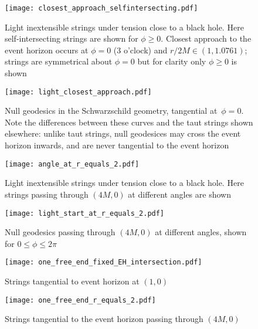 \documentclass[review]{elsarticle}
\begin{document}
\begin{figure}[p] %
\centering
\texttt{[image: closest\_approach\_selfintersecting.pdf]}
\caption{Light inextensible strings under tension close to a black
  hole.  Here self-intersecting strings are shown for $\phi\geqslant
  0$.  Closest approach to the event horizon occurs at $\phi=0$ (3
  o'clock) and $r/2M\in\left(1,1.0761\right)$; strings are symmetrical
  about $\phi=0$ but for clarity only $\phi\geqslant 0$ is shown}
\label{closest_approach_self_intersecting}
\end{figure}

\begin{figure}[p] %
\centering
\texttt{[image: light\_closest\_approach.pdf]}
\caption{Null geodesics in the Schwarzschild geometry, tangential
  at~$\phi=0$.  Note the differences between these curves and the taut
  strings shown elsewhere: unlike taut strings, null geodesices may
  cross the event horizon inwards, and are never tangential to the
  event horizon}
\label{light_closest_approach}
\end{figure}

\begin{figure}[p]
\centering
\texttt{[image: angle\_at\_r\_equals\_2.pdf]} %
\caption{Light inextensible strings under tension close to a black
  hole.  Here strings passing through $(4M,0)$ at different angles are
  shown}
\label{strings_r_equals_2}
\end{figure}

\begin{figure}[p]
\centering
\texttt{[image: light\_start\_at\_r\_equals\_2.pdf]} %
\caption{Null geodesics passing through $(4M,0)$ at different angles,
  shown for $0\leqslant\phi\leqslant 2\pi$}
\label{light_r_equals_2}
\end{figure}

\begin{figure}[p] %
\centering
\texttt{[image: one\_free\_end\_fixed\_EH\_intersection.pdf]}
\caption{Strings tangential to event horizon at $(1,0)$}
\label{fixed_EH_intersection}
\end{figure}

\begin{figure}[p] %
\centering
\texttt{[image: one\_free\_end\_r\_equals\_2.pdf]}
\caption{Strings tangential to the event horizon passing through $(4M,0)$}
\label{one_free_end_r_equals_2}
\end{figure}
\end{document}
